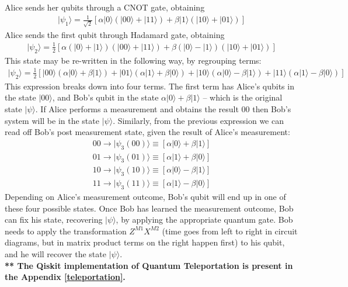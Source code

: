 \documentclass[12pt]{report}
\begin{document}
Alice sends her qubits through a CNOT gate, obtaining
\begin{equation}
\begin{split}
|\psi_1\rangle = \frac{1}{\sqrt{2}} [\alpha|0\rangle(|00\rangle + |11\rangle) + \beta|1\rangle(|10\rangle + |01\rangle)] 
\end{split}
\end{equation}
Alice sends the first qubit through Hadamard gate, obtaining
\begin{equation}
\begin{split}
|\psi_2\rangle = \frac{1}{2} [\alpha(|0\rangle + |1\rangle)(|00\rangle + |11\rangle) + \beta(|0\rangle - |1\rangle)(|10\rangle + |01\rangle)] 
\end{split}
\end{equation}
This state may be re-written in the following way, by regrouping terms:
\begin{equation}
\begin{split}
|\psi_2\rangle = \frac{1}{2} [|00\rangle(\alpha|0\rangle + \beta|1\rangle) + |01\rangle(\alpha|1\rangle + \beta|0\rangle) + |10\rangle(\alpha|0\rangle - \beta|1\rangle) + |11\rangle(\alpha|1\rangle - \beta|0\rangle)] 
\end{split}
\end{equation}
This expression breaks down into four terms. The first term has Alice’s qubits in the state $|00\rangle$, and Bob’s qubit in the state $\alpha|0\rangle + \beta|1\rangle$ – which is the original state $|\psi\rangle$. If Alice performs a measurement and obtains the result 00 then Bob’s system will be in the state $|\psi\rangle$. Similarly, from the previous expression we can read off Bob’s post measurement state, given the result of Alice’s measurement:
\begin{equation}
\begin{split}
00 \to |\psi_3(00)\rangle \equiv [\alpha|0\rangle + \beta|1\rangle] \\
01 \to |\psi_3(01)\rangle \equiv [\alpha|1\rangle + \beta|0\rangle]	\\
10 \to |\psi_3(10)\rangle \equiv [\alpha|0\rangle - \beta|1\rangle]	\\
11 \to |\psi_3(11)\rangle \equiv [\alpha|1\rangle - \beta|0\rangle]	
\end{split}
\end{equation}
Depending on Alice’s measurement outcome, Bob’s qubit will end up in one of these four possible states. Once Bob has learned the measurement outcome, Bob can fix his state, recovering $|\psi\rangle$, by applying the appropriate quantum gate. Bob needs to apply the transformation $Z^{M1}X^{M2}$ (time goes from left to right in circuit diagrams, but in matrix product terms on the right happen first) to his qubit, and he will recover the state $|\psi\rangle$.
\\
\textbf{** The Qiskit implementation of Quantum Teleportation is present in the Appendix \ref{teleportation}.}
\end{document}
